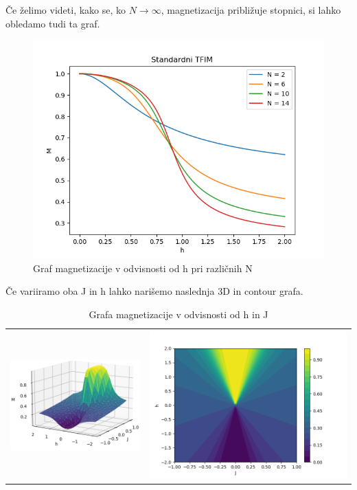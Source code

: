 \documentclass{article}
\begin{document}
\noindent Če želimo videti, kako se, ko $N \rightarrow \infty$, magnetizacija približuje stopnici, si lahko obledamo tudi ta graf.
\begin{figure}[H]
    \centering
    \includegraphics[width = \linewidth]{STFIM_variableN2.png}
    \caption{Graf magnetizacije v odvisnosti od h pri različnih N}
    \label{fig:enter-label}
\end{figure}

\newpage
\noindent Če variiramo oba J in h lahko narišemo naslednja 3D in contour grafa.
\begin{table}[H]
\begin{tabular}{c c}
     \includegraphics[width = .5 \linewidth]{STFIM2.png}
     &  
     \includegraphics[width = .5 \linewidth]{STFIM3.png}\\
\end{tabular}
\caption*{Grafa magnetizacije v odvisnosti od h in J}
\end{table}
\end{document}
